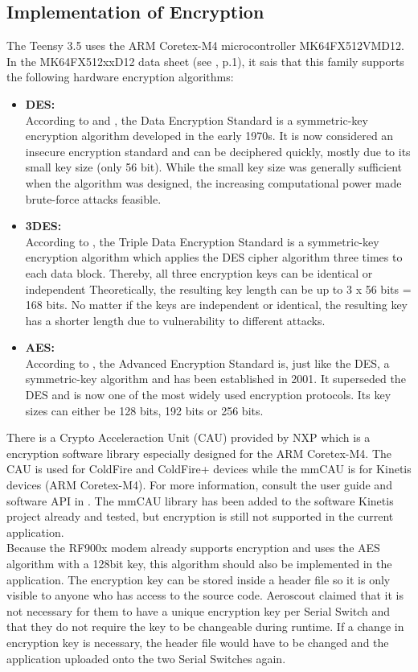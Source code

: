 \subsection{Implementation of Encryption}%
The Teensy 3.5 uses the ARM Coretex-M4 microcontroller MK64FX512VMD12. In the MK64FX512xxD12 data sheet (see \cite{NXP_Datasheet}, p.1), it sais that this family supports the following hardware encryption algorithms:\begin{itemize}
    \item \textbf{DES:}\\
    According to \cite{DES_Wikipedia} and \cite{3DES_Wikipedia}, the Data Encryption Standard is a symmetric-key encryption algorithm developed in the early 1970s. It is now considered an insecure encryption standard and can be deciphered quickly, mostly due to its small key size (only 56 bit).  While the small key size was generally sufficient when the algorithm was designed, the increasing computational power made brute-force attacks feasible. 
    \item \textbf{3DES:}\\
    According to \cite{3DES_Wikipedia}, the Triple Data Encryption Standard is a symmetric-key encryption algorithm which applies the DES cipher algorithm three times to each data block. Thereby, all three encryption keys can be identical or independent Theoretically, the resulting key length can be up to 3 x 56 bits = 168 bits. No matter if the keys are independent or identical, the resulting key has a shorter length due to vulnerability to different attacks. 
    \item \textbf{AES:}\\
    According to \cite{AES_Wikipedia}, the Advanced Encryption Standard is, just like the DES, a symmetric-key algorithm and has been established in 2001. It superseded the DES and is now one of the most widely used encryption protocols. Its key sizes can either be 128 bits, 192 bits or 256 bits. 
\end{itemize}
There is a Crypto Acceleraction Unit (CAU) provided by NXP which is a encryption software library especially designed for the ARM Coretex-M4. The CAU is used for ColdFire and ColdFire+ devices while the mmCAU is for Kinetis devices (ARM Coretex-M4). For more information, consult the user guide and software API in \cite{CAU_UserGuide}. The mmCAU library has been added to the software Kinetis project already and tested, but encryption is still not supported in the current application.\\
Because the RF900x modem already supports encryption and uses the AES algorithm with a 128bit key, this algorithm should also be implemented in the application. The encryption key can be stored inside a header file so it is only visible to anyone who has access to the source code. Aeroscout claimed that it is not necessary for them to have a unique encryption key per Serial Switch and that they do not require the key to be changeable during runtime. If a change in encryption key is necessary, the header file would have to be changed and the application uploaded onto the two Serial Switches again.
%
%
